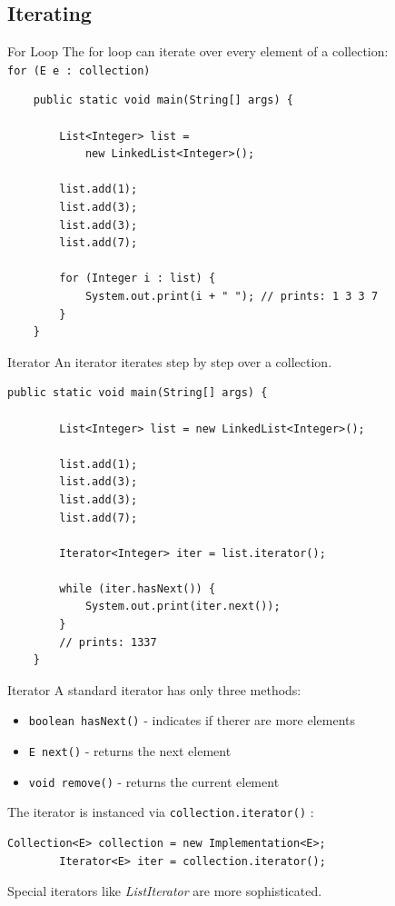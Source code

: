 \subsection{Iterating}
\begin{frame}[fragile]{For Loop}
	The for loop can iterate over every element of a collection:\\
	\hspace{1em}\texttt{for (E e : collection)}
	\begin{lstlisting}
	public static void main(String[] args) {
	
	    List<Integer> list = 
	        new LinkedList<Integer>();
	    
	    list.add(1);
	    list.add(3);
	    list.add(3);
	    list.add(7);
	    
	    for (Integer i : list) {
	        System.out.print(i + " "); // prints: 1 3 3 7
	    }
	}
	\end{lstlisting}
\end{frame}

\begin{frame}[fragile]{Iterator}
	An iterator iterates step by step over a collection.
	\begin{lstlisting}[basicstyle=\ttfamily\scriptsize]
	public static void main(String[] args) {
	
	    List<Integer> list = new LinkedList<Integer>();
	    
	    list.add(1);
	    list.add(3);
	    list.add(3);
	    list.add(7);
	    
	    Iterator<Integer> iter = list.iterator();
	    
	    while (iter.hasNext()) {
	        System.out.print(iter.next());
	    }
	    // prints: 1337
	}
	\end{lstlisting}
\end{frame}

\begin{frame}[fragile]{Iterator}
	A standard iterator has only three methods:
	\begin{itemize}
	\item \texttt{boolean hasNext()} - indicates if therer are more elements
	\item \texttt{E next()} - returns the next element
	\item \texttt{void remove()} - returns the current element
	\end{itemize}
	\vspace{1em}
	The iterator is instanced via \texttt{collection.iterator()} :
	\begin{lstlisting}[basicstyle=\ttfamily\scriptsize]
	    Collection<E> collection = new Implementation<E>;
	    Iterator<E> iter = collection.iterator();
	\end{lstlisting}
	Special iterators like \emph{ListIterator} are more sophisticated.
\end{frame}

